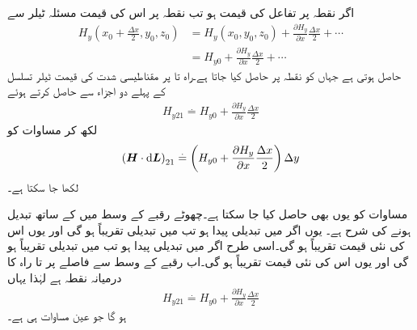اگر نقطہ  پر تفاعل  کی قیمت  ہو تب نقطہ  پر اس کی قیمت مسئلہ ٹیلر سے 
\begin{align*}
H_y(x_0+\tfrac{\Delta x}{2},y_0,z_0)&=H_y(x_0,y_0,z_0)+\frac{\partial H_y}{\partial x} \frac{\Delta x}{2}+\cdots\\
&=H_{y0}+\frac{\partial H_y}{\partial x} \frac{\Delta x}{2}+\cdots
\end{align*}
حاصل ہوتی ہے جہاں  کو نقطہ  پر حاصل کیا جاتا ہے۔راہ  تا  پر مقناطیسی شدت کی قیمت ٹیلر تسلسل کے پہلے دو اجزاء سے حاصل کرتے ہوئے
\begin{align}\label{مساوات_مقناطیسی_راہ_پہلے_حصے_پر_شدت}
H_{y21} \overset{.}{=}H_{y0}+\frac{\partial H_y}{\partial x} \frac{\Delta x}{2}
\end{align}
لکھ کر مساوات  کو
\begin{align}\label{مساوات_مقناطیسی_پہلے_حصہ_تکمل_الف}
\left( \kvec{H} \cdot \dif \kvec{L}\right)_{21}\overset{.}{=}\left(H_{y0}+\frac{\partial H_y}{\partial x} \frac{\Delta x}{2} \right)\Delta y 
\end{align}
لکھا جا سکتا ہے۔

مساوات  کو یوں بھی حاصل کیا جا سکتا ہے۔چھوٹے رقبے کے وسط میں  کے ساتھ  تبدیل ہونے کی شرح  ہے۔ یوں اگر  میں  تبدیلی پیدا ہو تب   میں تبدیلی تقریباً 
  ہو گی اور یوں اس کی نئی قیمت تقریباً  ہو گی۔اسی طرح اگر  میں  تبدیلی پیدا ہو تب   میں تبدیلی تقریباً  ہو گی اور یوں اس کی نئی قیمت تقریباً  ہو گی۔اب رقبے کے وسط سے   فاصلے پر   تا  راہ کا درمیانہ نقطہ ہے لہٰذا یہاں
\begin{align}\label{مساوات_مقناطیسی_راہ_پہلے_حصے_پر_شدت_دوبارہ}
H_{y21}\overset{.}{=}H_{y0}+\frac{\partial H_y}{\partial x}\frac{\Delta x}{2}
\end{align}
ہو گا جو عین مساوات  ہی  ہے۔

